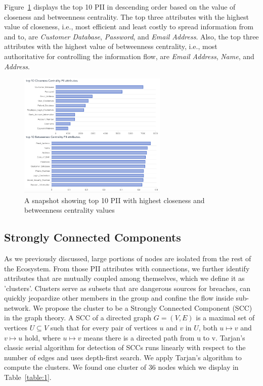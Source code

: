 \documentclass[conference]{IEEEtran}
\begin{document}
Figure~\ref{fig:top10_closeness_betweenness_centrality} displays the top 10 PII in descending order based on the value of closeness and betweenness centrality. The top three attributes with the highest value of closeness, i.e., most efficient and least costly to spread information from and to, are \textit{Customer Database}, \textit{Password}, and \textit{Email Address}. Also, the top three attributes with the highest value of betweenness centrality, i.e., most authoritative for controlling the information flow, are \textit{Email Address}, \textit{Name}, and \textit{Address}. 

\begin{figure}[h!]
  \includegraphics[width=\linewidth, height=6cm]{top10_closeness_betweenness_centrality.png}
  \caption{A snapshot showing  top  10  PII  with  highest closeness and betweenness centrality values}
  \label{fig:top10_closeness_betweenness_centrality}
\end{figure}

\subsection{Strongly Connected Components}
As we previously discussed, large portions of nodes are isolated from the rest of the Ecosystem. From those PII attributes with connections, we further identify attributes that are mutually coupled among themselves, which we define it as 'clusters'. Clusters serve as subsets that are dangerous sources for breaches, can quickly jeopardize other members in the group and confine the flow inside sub-network. 
We propose the cluster to be a Strongly Connected Component (SCC) in the graph theory. A SCC of a directed graph $G = (V, E)$ is a maximal set of vertices $U \subseteq V$ such that for every pair of vertices $u$ and $v$ in $U$, both $u \mapsto v$ and $v \mapsto u$ hold, where $u \mapsto v$ means there is a directed path from u to v. Tarjan's classic serial algorithm for detection of SCCs runs linearly with respect to the number of edges and uses depth-first search. We apply  Tarjan's algorithm \cite{Tarjan} to compute the clusters. We found one cluster of 36 nodes which we display in Table~\ref{table:1}.
\end{document}

